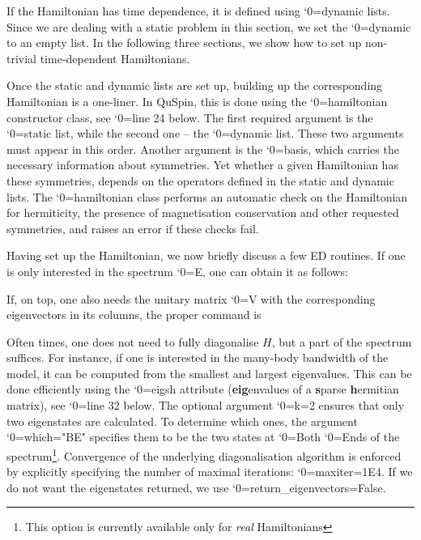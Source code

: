 \documentclass{SciPost}
\newcommand\0{\scalebox{-1}[1]{0}}
\let\svttfamily\ttfamily
\renewcommand\ttfamily{\svttfamily\catcode`0=\active }
\renewcommand\texttt{\bgroup\ttfamily\texttthelp}
\def\texttthelp#1{#1\egroup}
\begin{document}
 
%
If the Hamiltonian has time dependence, it is defined using \texttt{dynamic} lists. Since we are dealing with a static problem in this section, we set the \texttt{dynamic} to an empty list. In the following three sections, we show how to set up non-trivial time-dependent Hamiltonians.
 
%
Once the static and dynamic lists are set up, building up the corresponding Hamiltonian is a one-liner. In QuSpin, this is done using the \texttt{hamiltonian} constructor class, see \texttt{line 24} below. The first required argument is the \texttt{static} list, while the second one -- the \texttt{dynamic} list. These two arguments must appear in this order. Another argument is the \texttt{basis}, which carries the necessary information about symmetries. Yet whether a given Hamiltonian has these symmetries, depends on the operators defined in the static and dynamic lists. The \texttt{hamiltonian} class performs an automatic check on the Hamiltonian for hermiticity, the presence of magnetisation conservation and other requested symmetries, and raises an error if these checks fail.

% 
Having set up the Hamiltonian, we now briefly discuss a few ED routines. If one is only interested in the spectrum \texttt{E}, one can obtain it as follows:

% 
If, on top, one also needs the unitary matrix \texttt{V} with the corresponding eigenvectors in its columns, the proper command is

%
Often times, one does not need to fully diagonalise $H$, but a part of the spectrum suffices. For instance, if one is interested in the many-body bandwidth of the model, it can be computed from the smallest and largest eigenvalues. This can be done efficiently using the \texttt{eigsh} attribute ({\bf eig}envalues of a {\bf s}parse {\bf h}ermitian matrix), see \texttt{line 32} below.  The optional argument \texttt{k=2} ensures that only two eigenstates are calculated. To determine which ones, the argument \texttt{which="BE"} specifies  them to be the two states at \texttt{B}oth \texttt{E}nds of the spectrum\footnote{This option is currently available only for \emph{real} Hamiltonians}. Convergence of the underlying diagonalisation algorithm is enforced by explicitly specifying the number of maximal iterations: \texttt{maxiter=1E4}. If we do not want the eigenstates returned, we use \texttt{return\_eigenvectors=False}.
\end{document}
